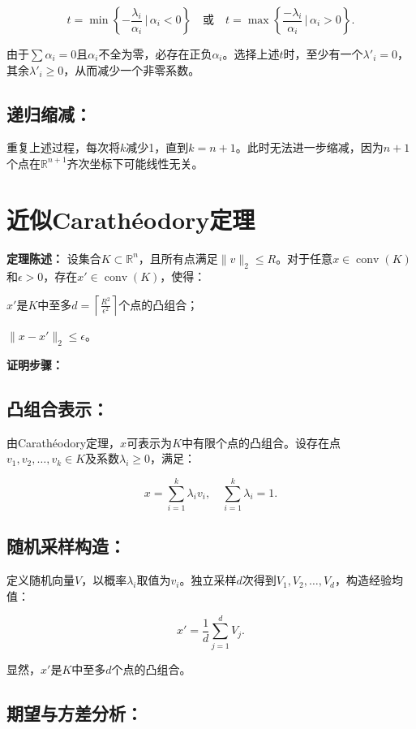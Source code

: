 \documentclass{article}
\begin{document}
\[
t = \min \left\{ -\frac{\lambda_i}{\alpha_i} \, \bigg| \, \alpha_i < 0 \right\} \quad \text{或} \quad t = \max \left\{ \frac{-\lambda_i}{\alpha_i} \, \bigg| \, \alpha_i > 0 \right\}.
\]

由于\( \sum \alpha_i = 0 \)且\( \alpha_i \)不全为零，必存在正负\( \alpha_i \)。选择上述\( t \)时，至少有一个\( \lambda'_i = 0 \)，其余\( \lambda'_i \geq 0 \)，从而减少一个非零系数。

\subsection{递归缩减：}
重复上述过程，每次将\( k \)减少1，直到\( k = n+1 \)。此时无法进一步缩减，因为\( n+1 \)个点在\(\mathbb{R}^{n+1}\)齐次坐标下可能线性无关。

\section{近似Carathéodory定理}

\textbf{定理陈述：} 设集合\( K \subset \mathbb{R}^n \)，且所有点满足\( \| v \|_2 \leq R \)。对于任意\( x \in \operatorname{conv}(K) \)和\( \epsilon > 0 \)，存在\( x' \in \operatorname{conv}(K) \)，使得：

\( x' \)是\( K \)中至多\( d = \left\lceil \frac{R^2}{\epsilon^2} \right\rceil \)个点的凸组合；

\( \| x - x' \|_2 \leq \epsilon \)。

\textbf{证明步骤：}

\subsection{凸组合表示：}
由Carathéodory定理，\( x \)可表示为\( K \)中有限个点的凸组合。设存在点\( v_1, v_2, \ldots, v_k \in K \)及系数\( \lambda_i \geq 0 \)，满足：

\[
x = \sum_{i=1}^{k} \lambda_i v_i, \quad \sum_{i=1}^{k} \lambda_i = 1.
\]

\subsection{随机采样构造：}
定义随机向量\( V \)，以概率\( \lambda_i \)取值为\( v_i \)。独立采样\( d \)次得到\( V_1, V_2, \ldots, V_d \)，构造经验均值：

\[
x' = \frac{1}{d} \sum_{j=1}^{d} V_j.
\]

显然，\( x' \)是\( K \)中至多\( d \)个点的凸组合。

\subsection{期望与方差分析：}
\end{document}
